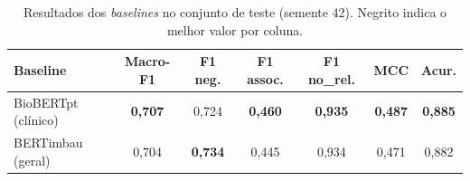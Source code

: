 \begin{table}[ht]
\centering
\caption{Resultados dos \emph{baselines} no conjunto de teste (semente 42).
Negrito indica o melhor valor por coluna.}
\label{tab:resultados}
\begin{tabular}{lcccccc}
\toprule
\textbf{Baseline} & \textbf{Macro-F1} &
\textbf{F1 neg.} &
\textbf{F1 assoc.} &
\textbf{F1 no\_rel.} &
\textbf{MCC} &
\textbf{Acur.} \\
\midrule
BioBERTpt (clínico) & \textbf{0,707} & 0,724 & \textbf{0,460} & \textbf{0,935} & \textbf{0,487} & \textbf{0,885} \\
BERTimbau (geral) & 0,704 & \textbf{0,734} & 0,445 & 0,934 & 0,471 & 0,882 \\
\bottomrule
\end{tabular}
\end{table}
